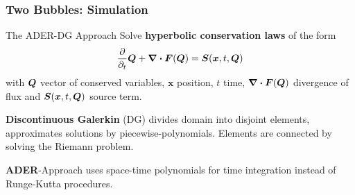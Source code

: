 \documentclass[aspectratio=169]{beamer}
\begin{document}
\begin{frame}
  \frametitle{Two Bubbles: Simulation}
  \begin{center}
    {
 }
  \end{center}
\end{frame}

\begin{frame}{The ADER-DG Approach}
  Solve \textbf{hyperbolic conservation laws} of the form
\begin{equation}
  \label{eq:conservation-law}
 \frac{\partial}{\partial_t}  \Q + \divergence{\flux(\Q)} = \source(\bm{x}, t, \Q)
\end{equation}
with $\bm{Q}$ vector of conserved variables, $\bm{x}$ position, $t$ time,  $\divergence{\flux(\Q)}$ divergence of flux and $\source(\bm{x}, t, \Q)$ source term.

\textbf{Discontinuous Galerkin} (DG) divides domain into disjoint elements, approximates solutions by piecewise-polynomials.
Elements are connected by solving the Riemann problem.

\textbf{ADER}-Approach uses space-time polynomials for time integration instead of Runge-Kutta procedures.
\end{frame}
\end{document}
